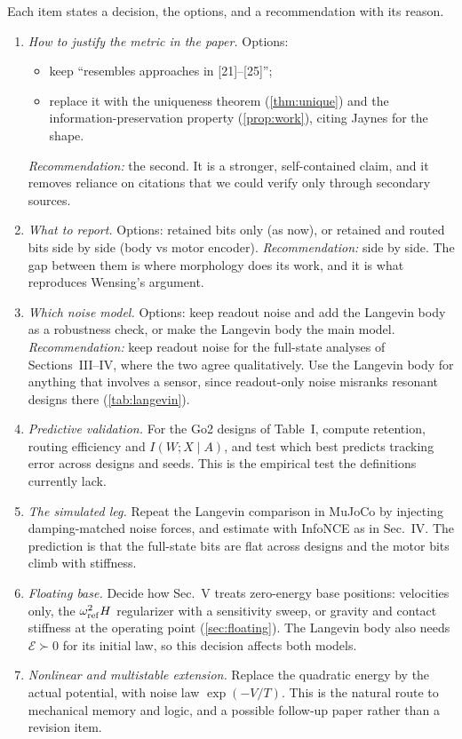 \documentclass[11pt]{article}
\theoremstyle{definition}
\theoremstyle{remark}
\newcommand{\Em}{\mathcal{E}}         %
\begin{document}
Each item states a decision, the options, and a recommendation with its reason.

\begin{enumerate}
  \item \emph{How to justify the metric in the paper.} Options:
        \begin{itemize}[nosep]
          \item keep ``resembles approaches in [21]--[25]'';
          \item replace it with the uniqueness theorem (\cref{thm:unique}) and the
                information-preservation property (\cref{prop:work}), citing Jaynes for
                the shape.
        \end{itemize}
        \emph{Recommendation:} the second. It is a stronger, self-contained claim, and it
        removes reliance on citations that we could verify only through secondary
        sources.
  \item \emph{What to report.} Options: retained bits only (as now), or retained and
        routed bits side by side (body vs motor encoder).
        \emph{Recommendation:} side by side. The gap between them is where morphology does
        its work, and it is what reproduces Wensing's argument.
  \item \emph{Which noise model.} Options: keep readout noise and add the Langevin body as
        a robustness check, or make the Langevin body the main model.
        \emph{Recommendation:} keep readout noise for the full-state analyses of
        Sections~III--IV, where the two agree qualitatively. Use the Langevin body for
        anything that involves a sensor, since readout-only noise misranks resonant
        designs there (\cref{tab:langevin}).
  \item \emph{Predictive validation.} For the Go2 designs of Table~I, compute retention,
        routing efficiency and $I(W;X\mid A)$, and test which best predicts tracking
        error across designs and seeds. This is the empirical test the definitions
        currently lack.
  \item \emph{The simulated leg.} Repeat the Langevin comparison in MuJoCo by injecting
        damping-matched noise forces, and estimate with InfoNCE as in Sec.~IV. The
        prediction is that the full-state bits are flat across designs and the motor bits
        climb with stiffness.
  \item \emph{Floating base.} Decide how Sec.~V treats zero-energy base positions:
        velocities only, the $\omega_{\rm ref}^2H$ regularizer with a sensitivity sweep,
        or gravity and contact stiffness at the operating point (\cref{sec:floating}).
        The Langevin body also needs $\Em\succ0$ for its initial law, so this decision
        affects both models.
  \item \emph{Nonlinear and multistable extension.} Replace the quadratic energy by the
        actual potential, with noise law $\exp(-V/T)$. This is the natural route to
        mechanical memory and logic, and a possible follow-up paper rather than a
        revision item.
\end{enumerate}
\end{document}
